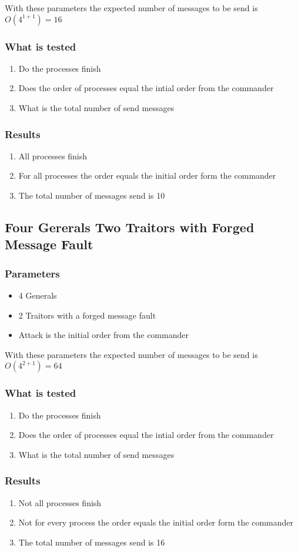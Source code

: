 \documentclass[a4paper, notitlepage]{article}
\begin{document}
With these parameters the expected number of messages to be send is \(O(4^{1+1}) = 16\)

\subsubsection*{What is tested}
\begin{enumerate}
\item Do the processes finish
\item Does the order of processes equal the intial order from the commander
\item What is the total number of send messages
\end{enumerate}

\subsubsection*{Results}
\begin{enumerate}
\item All processes finish
\item For all processes the order equals the initial order form the commander
\item The total number of messages send is 10
\end{enumerate}





\subsection{Four Gererals Two Traitors with Forged Message Fault}

\subsubsection*{Parameters}
\begin{itemize}
\item 4 Generals
\item 2 Traitors with a forged message fault
\item Attack is the initial order from the commander
\end{itemize}

With these parameters the expected number of messages to be send is \(O(4^{2+1}) = 64\)

\subsubsection*{What is tested}
\begin{enumerate}
\item Do the processes finish
\item Does the order of processes equal the intial order from the commander
\item What is the total number of send messages
\end{enumerate}

\subsubsection*{Results}
\begin{enumerate}
\item Not all processes finish
\item Not for every process the order equals the initial order form the commander
\item The total number of messages send is 16
\end{enumerate}
\end{document}
